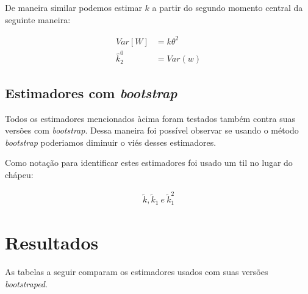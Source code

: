 \documentclass[12pt]{article}
\begin{document}
De maneira similar podemos estimar $k$ a partir do segundo
momento central da seguinte maneira:

\begin{align}
  Var[W] &= k\theta^2 \\
  \hat{k}_2^0 &= Var(w) 
\end{align}

\subsection{Estimadores com \textit{bootstrap}}

Todos os estimadores mencionados àcima foram testados também contra
suas versões com \textit{bootstrap}. Dessa maneira foi possível
observar se usando o método \textit{bootstrap} poderiamos diminuir o
viés desses estimadores.

Como notação para identificar estes estimadores foi usado um til no
lugar do chápeu:

\begin{align*}
  \tilde{k}, \tilde{k}_1\ e\ \tilde{k}_1^2
\end{align*}





\section{Resultados}

As tabelas a seguir comparam os estimadores usados com suas versões
\textit{bootstraped}. 
\end{document}

